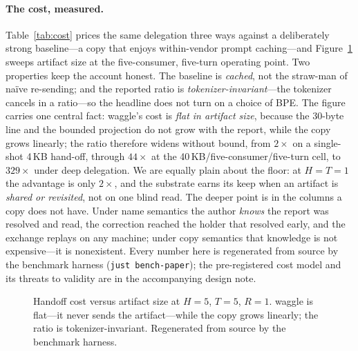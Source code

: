 \documentclass[10pt,twocolumn]{article}
\begin{document}
\paragraph{The cost, measured.} Table~\ref{tab:cost} prices the same
delegation three ways against a deliberately strong baseline---a copy that
enjoys within-vendor prompt caching---and Figure~\ref{fig:cost} sweeps
artifact size at the five-consumer, five-turn operating point. Two
properties keep the account honest. The baseline is \emph{cached}, not the
straw-man of naïve re-sending; and the reported ratio is
\emph{tokenizer-invariant}---the tokenizer cancels in a ratio---so the
headline does not turn on a choice of BPE. The figure carries one central
fact: waggle's cost is \emph{flat in artifact size}, because the 30-byte
line and the bounded projection do not grow with the report, while the copy
grows linearly; the ratio therefore widens without bound, from
$2\times$ on a single-shot 4\,KB hand-off, through $44\times$ at the
40\,KB/five-consumer/five-turn cell, to $329\times$ under deep delegation.
We are equally plain about the floor: at $H{=}T{=}1$ the advantage is only
$2\times$, and the substrate earns its keep when an artifact is
\emph{shared or revisited}, not on one blind read. The deeper point is in
the columns a copy does not have. Under name semantics the author
\emph{knows} the report was resolved and read, the correction reached the
holder that resolved early, and the exchange replays on any machine; under
copy semantics that knowledge is not expensive---it is nonexistent. Every
number here is regenerated from source by the benchmark harness
(\texttt{just bench-paper}); the pre-registered cost model and its threats
to validity are in the accompanying design note.



\begin{figure}[t]
\centering
{}
\caption{Handoff cost versus artifact size at $H{=}5$, $T{=}5$, $R{=}1$.
waggle is flat---it never sends the artifact---while the copy grows
linearly; the ratio is tokenizer-invariant. Regenerated from source by
the benchmark harness.}
\label{fig:cost}
\end{figure}
\end{document}
